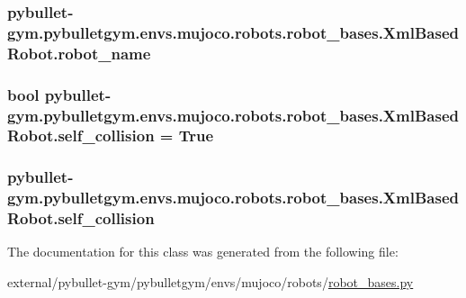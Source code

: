 \subsubsection[{\texorpdfstring{robot\+\_\+name}{robot_name}}]{\setlength{\rightskip}{0pt plus 5cm}pybullet-\/gym.\+pybulletgym.\+envs.\+mujoco.\+robots.\+robot\+\_\+bases.\+Xml\+Based\+Robot.\+robot\+\_\+name}\hypertarget{classpybullet-gym_1_1pybulletgym_1_1envs_1_1mujoco_1_1robots_1_1robot__bases_1_1_xml_based_robot_a5cbeb6a59e6f3507b1786ab2c99dad77}{}\label{classpybullet-gym_1_1pybulletgym_1_1envs_1_1mujoco_1_1robots_1_1robot__bases_1_1_xml_based_robot_a5cbeb6a59e6f3507b1786ab2c99dad77}
\subsubsection[{\texorpdfstring{self\+\_\+collision}{self_collision}}]{\setlength{\rightskip}{0pt plus 5cm}bool pybullet-\/gym.\+pybulletgym.\+envs.\+mujoco.\+robots.\+robot\+\_\+bases.\+Xml\+Based\+Robot.\+self\+\_\+collision = True\hspace{0.3cm}{\ttfamily [static]}}\hypertarget{classpybullet-gym_1_1pybulletgym_1_1envs_1_1mujoco_1_1robots_1_1robot__bases_1_1_xml_based_robot_aecec207b8ac56d1e4c6035ab29c49969}{}\label{classpybullet-gym_1_1pybulletgym_1_1envs_1_1mujoco_1_1robots_1_1robot__bases_1_1_xml_based_robot_aecec207b8ac56d1e4c6035ab29c49969}
\subsubsection[{\texorpdfstring{self\+\_\+collision}{self_collision}}]{\setlength{\rightskip}{0pt plus 5cm}pybullet-\/gym.\+pybulletgym.\+envs.\+mujoco.\+robots.\+robot\+\_\+bases.\+Xml\+Based\+Robot.\+self\+\_\+collision}\hypertarget{classpybullet-gym_1_1pybulletgym_1_1envs_1_1mujoco_1_1robots_1_1robot__bases_1_1_xml_based_robot_a62ae0daf42e40246ddeade5892e5701c}{}\label{classpybullet-gym_1_1pybulletgym_1_1envs_1_1mujoco_1_1robots_1_1robot__bases_1_1_xml_based_robot_a62ae0daf42e40246ddeade5892e5701c}


The documentation for this class was generated from the following file\+:\begin{DoxyCompactItemize}
\item 
external/pybullet-\/gym/pybulletgym/envs/mujoco/robots/\hyperlink{mujoco_2robots_2robot__bases_8py}{robot\+\_\+bases.\+py}\end{DoxyCompactItemize}
